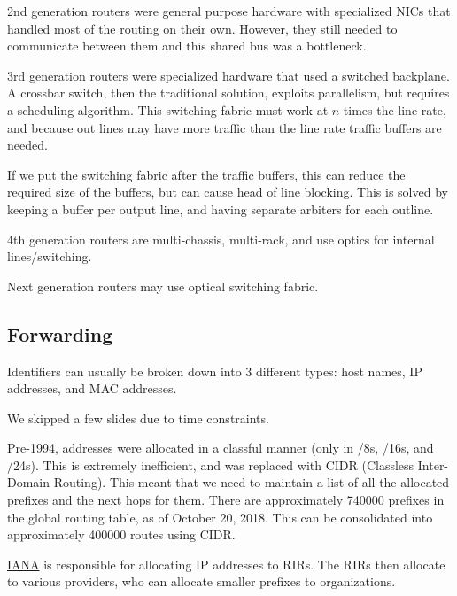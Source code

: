 \documentclass{idc_msc}
\begin{document}
2nd generation routers were general purpose hardware with specialized NICs that handled most of the routing on their own. However, they still needed to communicate between them and this shared bus was a bottleneck.

3rd generation routers were specialized hardware that used a switched backplane.
A crossbar switch, then the traditional solution, exploits parallelism, but requires a scheduling algorithm.
This switching fabric must work at \(n\) times the line rate, and because out lines may have more traffic than the line rate traffic buffers are needed.

If we put the switching fabric after the traffic buffers, this can reduce the required size of the buffers, but can cause head of line blocking.
This is solved by keeping a buffer per output line, and having separate arbiters for each outline.

4th generation routers are multi-chassis, multi-rack, and use optics for internal lines/switching.

Next generation routers may use optical switching fabric.

\subsection{Forwarding}


Identifiers can usually be broken down into 3 different types: host names, IP addresses, and MAC addresses.

We skipped a few slides due to time constraints.

Pre-1994, addresses were allocated in a classful manner (only in /8s, /16s, and /24s).
This is extremely inefficient, and was replaced with CIDR (Classless Inter-Domain Routing).
This meant that we need to maintain a list of all the allocated prefixes and the next hops for them.
There are approximately 740000 prefixes in the global routing table, as of October 20, 2018.
This can be consolidated into approximately 400000 routes using CIDR.

\href{https://www.iana.org}{IANA} is responsible for allocating IP addresses to RIRs.
The RIRs then allocate to various providers, who can allocate smaller prefixes to organizations.
\end{document}
